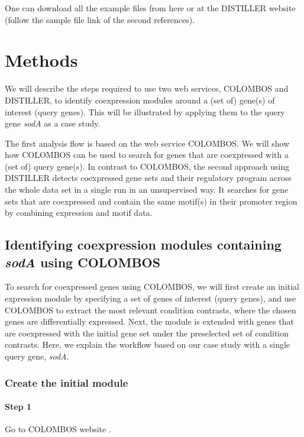 One can download all the example files from here \cite{DISTILLER-sample} or at 
the DISTILLER website \cite{DISTILLER} (follow the sample file link of the 
second references).




\section{Methods}

We will describe the steps required to use two web services, COLOMBOS and 
DISTILLER, to identify coexpression modules around a (set of) gene(s) of 
interest (query genes). This will be illustrated by applying them to the query 
gene \textit{sodA} as a case study.

The first analysis flow is based on the web service COLOMBOS. We will show how 
COLOMBOS can be used to search for genes that are coexpressed with a (set of) 
query gene(s). In contrast to COLOMBOS, the second approach using DISTILLER 
detects coexpressed gene sets and their regulatory program across the whole 
data set in a single run in an unsupervised way. It searches for gene sets that 
are coexpressed and contain the same motif(s) in their promoter region by 
combining expression and motif data.


\subsection{Identifying coexpression modules containing \textit{sodA} using 
COLOMBOS}\label{sec:dist-module-colombos}

To search for coexpressed genes using COLOMBOS, we will first create an initial 
expression module by specifying a set of genes of interest (query genes), and 
use COLOMBOS to extract the most relevant condition contrasts, where the chosen 
genes are differentially expressed.  
Next, the module is extended with genes that are coexpressed with 
the initial gene set under the preselected set of condition contrasts. Here, we 
explain the workflow based on our case study with a single query gene, 
\textit{sodA}.

\subsubsection{Create the initial module}

\paragraph{Step 1}	Go to COLOMBOS website \cite{COLOMBOS}.

